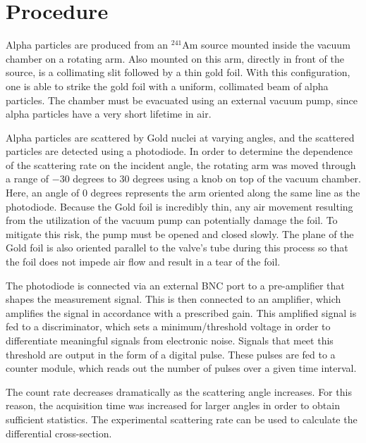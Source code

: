 \documentclass[a4paper]{article}
\begin{document}
\section{Procedure}


\qq Alpha particles are produced from an $^{241}$Am source mounted inside the
vacuum chamber on a rotating arm. Also mounted on this arm, directly in front of
the source, is a collimating slit followed by a thin gold foil. With this
configuration, one is able to strike the gold foil with a uniform, collimated
beam of alpha particles. The chamber must be evacuated using an external vacuum
pump, since alpha particles have a very short lifetime in air.

\qq Alpha particles are scattered by Gold nuclei at varying angles, and the
scattered particles are detected using a photodiode. In order to determine the
dependence of the scattering rate on the incident angle, the rotating arm was
moved through a range of $-30$ degrees to $30$ degrees using a knob on top of
the vacuum chamber. Here, an angle of 0 degrees represents the arm oriented
along the same line as the photodiode. Because the Gold foil is
incredibly thin, any air movement resulting from the utilization of the vacuum pump can potentially damage the foil. To mitigate this risk, the pump must be opened and closed slowly. The plane of the Gold foil is also oriented parallel to the valve's tube during this process so that the foil does not impede air flow and result in a tear of the foil.

\qq The photodiode is connected via an external BNC port to a pre-amplifier that
shapes the measurement signal. This is then connected to an amplifier, which
amplifies the signal in accordance with a prescribed gain. This amplified signal
is fed to a discriminator, which sets a minimum/threshold voltage in order to
differentiate meaningful signals from electronic noise. Signals that meet this
threshold are output in the form of a digital pulse. These pulses are fed to a
counter module, which reads out the number of pulses over a given time interval.

The count rate decreases dramatically as the scattering angle increases. For
this reason, the acquisition time was increased for larger angles in order to
obtain sufficient statistics. The experimental scattering rate can be used to
calculate the differential cross-section.
\end{document}
